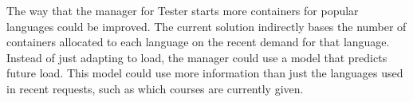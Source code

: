 The way that the manager for Tester starts more containers for popular languages could be improved. The current solution indirectly bases the number of containers allocated to each language on the recent demand for that language. Instead of just adapting to load, the manager could use a model that predicts future load. This model could use more information than just the languages used in recent requests, such as which courses are currently given.
